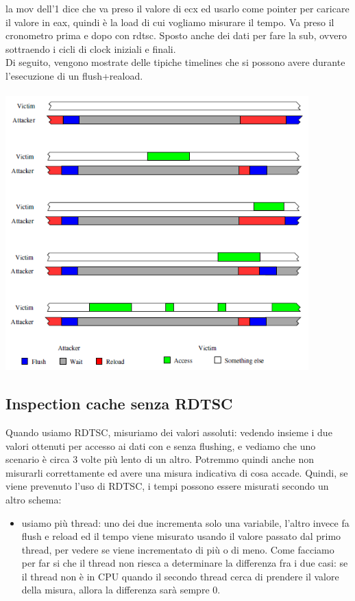 \documentclass[14pt, oneside]{book}
\begin{document}
la mov dell'1 dice che va preso il valore di ecx ed usarlo come pointer per caricare il valore in eax, quindi è la load di cui vogliamo misurare il tempo. Va preso il cronometro prima e dopo con rdtsc. Sposto anche dei dati per fare la sub, ovvero sottraendo i cicli di clock iniziali e finali.\\ Di seguito, vengono mostrate delle tipiche timelines che si possono avere durante l'esecuzione di un flush+reaload.\\\\
\includegraphics[scale=0.5]{immagini/flrel}
\subsection{Inspection cache senza RDTSC}
Quando usiamo RDTSC, misuriamo dei valori assoluti: vedendo insieme i due valori ottenuti per accesso ai dati con e senza flushing, e vediamo che uno scenario è circa 3 volte più lento di un altro. Potremmo quindi anche non misurarli correttamente ed avere una misura indicativa di cosa accade. Quindi, se viene prevenuto l'uso di RDTSC, i tempi possono essere misurati secondo un altro schema:
\begin{itemize}
\item usiamo più thread: uno dei due incrementa solo una variabile, l'altro invece fa flush e reload ed il tempo viene misurato usando il valore passato dal primo thread, per vedere se viene incrementato di più o di meno. Come facciamo per far si che il thread non riesca a determinare la differenza fra i due casi: se il thread non è in CPU quando il secondo thread cerca di prendere il valore della misura, allora la differenza sarà sempre 0.
\end{itemize}
\end{document}
